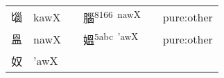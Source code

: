 \documentclass[14pt,a4paper]{scrartcl}
\begin{document}
\begin{longtable}[c]{@{}llllll@{}}
\begin{minipage}[t]{0.14\columnwidth}\raggedright\strut
匘
\strut\end{minipage} &
\begin{minipage}[t]{0.14\columnwidth}\raggedright\strut
kawX
\strut\end{minipage} &
\begin{minipage}[t]{0.14\columnwidth}\raggedright\strut
\strut\end{minipage} &
\begin{minipage}[t]{0.14\columnwidth}\raggedright\strut
腦\textsuperscript{8166~nawX}
\strut\end{minipage} &
\begin{minipage}[t]{0.14\columnwidth}\raggedright\strut
\strut\end{minipage} &
\begin{minipage}[t]{0.14\columnwidth}\raggedright\strut
pure:other
\strut\end{minipage}\tabularnewline
\begin{minipage}[t]{0.14\columnwidth}\raggedright\strut
𥁕
\strut\end{minipage} &
\begin{minipage}[t]{0.14\columnwidth}\raggedright\strut
nawX
\strut\end{minipage} &
\begin{minipage}[t]{0.14\columnwidth}\raggedright\strut
\strut\end{minipage} &
\begin{minipage}[t]{0.14\columnwidth}\raggedright\strut
媼\textsuperscript{5abc~'awX}
\strut\end{minipage} &
\begin{minipage}[t]{0.14\columnwidth}\raggedright\strut
\strut\end{minipage} &
\begin{minipage}[t]{0.14\columnwidth}\raggedright\strut
pure:other
\strut\end{minipage}\tabularnewline
\begin{minipage}[t]{0.14\columnwidth}\raggedright\strut
奴
\strut\end{minipage} &
\begin{minipage}[t]{0.14\columnwidth}\raggedright\strut
'awX
\strut\end{minipage} &
\begin{minipage}[t]{0.14\columnwidth}\raggedright\strut
\strut\end{minipage} &
\begin{minipage}[t]{0.14\columnwidth}\raggedright\strut

\end{minipage}
\end{longtable}
\end{document}
